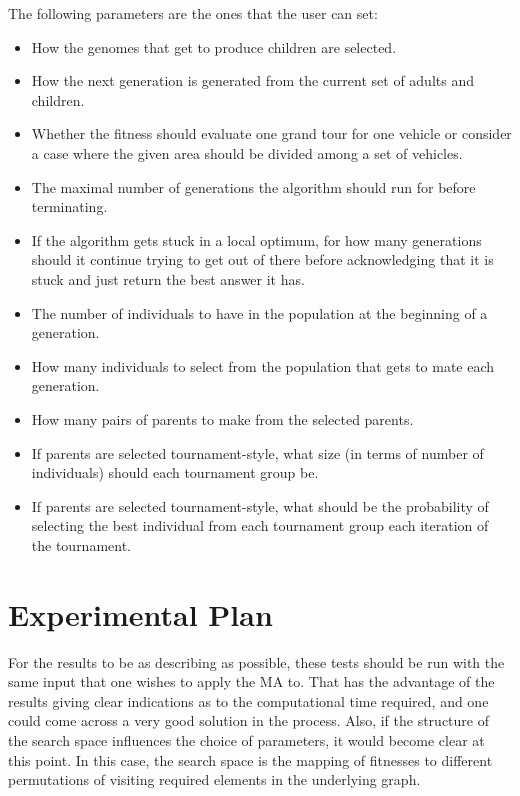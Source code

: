 The following parameters are the ones that the user can set:
\begin{itemize}
    \item How the genomes that get to produce children are selected.
    \item How the next generation is generated from the current set of adults and children.
    \item Whether the fitness should evaluate one grand tour for one vehicle or consider a case where the given area should be divided among a set of vehicles.
    \item The maximal number of generations the algorithm should run for before terminating.
    \item If the algorithm gets stuck in a local optimum, for how many generations should it continue trying to get out of there before acknowledging that it is stuck and just return the best answer it has.
    \item The number of individuals to have in the population at the beginning of a generation.
    \item How many individuals to select from the population that gets to mate each generation.
    \item How many pairs of parents to make from the selected parents.
    \item If parents are selected tournament-style, what size (in terms of number of individuals) should each tournament group be.
    \item If parents are selected tournament-style, what should be the probability of selecting the best individual from each tournament group each iteration of the tournament.

\end{itemize}

\section{Experimental Plan} %
\label{sec:experimental_plan}
For the results to be as describing as possible, these tests should be run with the same input that one wishes to apply the MA to. That has the advantage of the results giving clear indications as to the computational time required, and one could come across a very good solution in the process. Also, if the structure of the search space influences the choice of parameters, it would become clear at this point. In this case, the search space is the mapping of fitnesses to different permutations of visiting required elements in the underlying graph.


